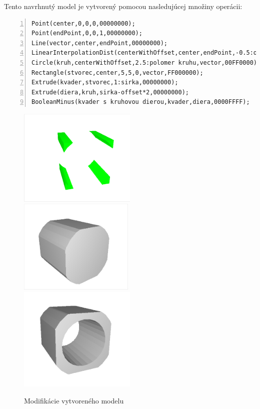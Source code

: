Tento navrhnutý model je vytvorený pomocou nasledujúcej množiny operácii:\nopagebreak

\vspace{10px}
\begin{minipage}{\linewidth}
\begin{lstlisting}[frame = {tb},numbers={left}]
Point(center,0,0,0,00000000);
Point(endPoint,0,0,1,00000000);
Line(vector,center,endPoint,00000000);
LinearInterpolationDist(centerWithOffset,center,endPoint,-0.5:offset,00000000);
Circle(kruh,centerWithOffset,2.5:polomer kruhu,vector,00FF0000);
Rectangle(stvorec,center,5,5,0,vector,FF000000);
Extrude(kvader,stvorec,1:sirka,00000000);
Extrude(diera,kruh,sirka-offset*2,00000000);
BooleanMinus(kvader s kruhovou dierou,kvader,diera,0000FFFF);
\end{lstlisting}
\end{minipage}

\begin{figure}[H]
	\centering
	\includegraphics[trim=10 10 10 10,clip,width=0.50\textwidth]{obrazky-figures/Examples/kvader s dierou4.png}
	\includegraphics[trim=10 10 10 10,clip,width=0.49\textwidth]{obrazky-figures/Examples/followUp.png}
	\includegraphics[trim=10 10 10 10,clip,width=0.50\textwidth]{obrazky-figures/Examples/followup3.png}
	\caption{Modifikácie vytvoreného modelu}
	\label{fig:qwert}
\end{figure}

